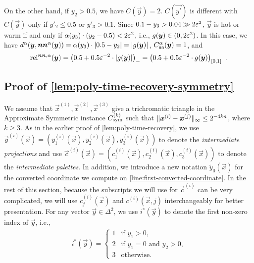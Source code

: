 On the other hand, if $y_2> 0.5$, we have $C(\vec{y})=2$. 
$C(\vec{y'})$ is different with $C(\vec{y})$ only if $y'_2\leq 0.5$ or $y'_3>0.1$. 
Since $0.1-y_3>0.04\gg 2\eps^2$, $\vec{y}$ is hot or warm if and only if $\alpha(y_3) \cdot (y_2-0.5)<2\eps^2$, i.e., $g(\vec{y})\in (0,2\eps^2)$. 
In this case, we have $d^{\alpha}(\vec{y}, \nna(\vec{y})) = \alpha(y_3)\cdot |0.5-y_2| = |g(\vec{y})|$, $C^{\alpha}_{\sf nn}(\vec{y})=1$, and 
\begin{align*}
    \rela(\vec{y}) = \left(0.5+0.5\eps^{-2}\cdot |g(\vec{y})|\right)_- = \left(0.5+0.5\eps^{-2}\cdot g(\vec{y})\right)_{[0,1]}~.
\end{align*}

\subsection{Proof of \cref{lem:poly-time-recovery-symmetry}}
\label{proof:poly-time-recovery-symmetry}

\repiv*

We assume that $\vec{x}^{(1)}, \vec{x}^{(2)}, \vec{x}^{(3)}$ give a trichromatic triangle in the \outofk Approximate Symmetric \Sperner instance $\Csym{k}$ such that $\normtxt{\vec{x}^{(i)}-\vec{x}^{(j)}}\infty\leq 2^{-4kn}$, where $k\geq 3$.
As in the earlier proof of \cref{lem:poly-time-recovery}, 
we use $\vec{y}^{(i)}(\vec{x}) = (y^{(i)}_1(\vec{x}), y^{(i)}_2(\vec{x}), y^{(i)}_3(\vec{x}))$
to denote the {\em intermediate projections} and use
$\vec{c}^{(i)}(\vec{x}) = (c^{(i)}_1(\vec{x}), c^{(i)}_2(\vec{x}), c^{(i)}_3(\vec{x}))$ 
to denote the {\em intermediate palettes}.
In addition, we introduce a new notation $\tilde{y}_0(\vec{x})$ for the converted coordinate we compute on \cref{line:first-converted-coordinate}.
In the rest of this section, because the subscripts we will use for $\vec{c}^{(i)}$ can be very complicated, we will use $c_j^{(i)}(\vec{x})$ and $c^{(i)}(\vec{x}, j)$ interchangeably for better presentation.
For any vector $\vec{y}\in \Delta^2$, we use $i^*(\vec{y})$ to denote the first non-zero index of $\vec{y}$, i.e., 
\begin{align}
    \label{eqn:first-nonzero-index-symmetry}
    i^*(\vec{y}) = \begin{cases}
        1 & \text{if $y_1>0$,}\\
        2 & \text{if $y_1=0$ and $y_2>0$,}\\
        3 & \text{otherwise.}
    \end{cases}
\end{align}

